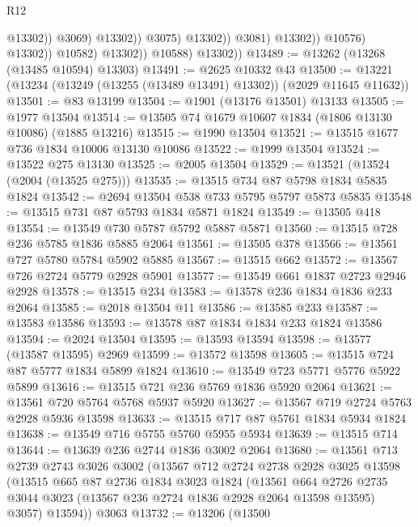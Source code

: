 \begin{lexlean}{R12}
\begin{coremodule}
                                            @13302))
                                        @3069)
                                      @13302))
                                  @3075)
                                @13302))
                            @3081)
                          @13302))
                      @10576)
                    @13302))
                @10582)
              @13302))
          @10588)
        @13302))
@13489 := @13262 (@13268 (@13485 @10594) @13303)
@13491 := @2625 @10332 @43
@13500 := @13221 (@13234 (@13249 (@13255 (@13489 @13491) @13302)) (@2029 @11645 @11632))
@13501 := @83 @13199
@13504 := @1901 (@13176 @13501) @13133
@13505 := @1977 @13504
@13514 := @13505 @74 @1679 @10607 @1834 (@1806 @13130 @10086) (@1885 @13216)
@13515 := @1990 @13504
@13521 := @13515 @1677 @736 @1834 @10006 @13130 @10086
@13522 := @1999 @13504
@13524 := @13522 @275 @13130
@13525 := @2005 @13504
@13529 := @13521 (@13524 (@2004 (@13525 @275)))
@13535 := @13515 @734 @87 @5798 @1834 @5835 @1824
@13542 := @2694 @13504 @538 @733 @5795 @5797 @5873 @5835
@13548 := @13515 @731 @87 @5793 @1834 @5871 @1824
@13549 := @13505 @418
@13554 := @13549 @730 @5787 @5792 @5887 @5871
@13560 := @13515 @728 @236 @5785 @1836 @5885 @2064
@13561 := @13505 @378
@13566 := @13561 @727 @5780 @5784 @5902 @5885
@13567 := @13515 @662
@13572 := @13567 @726 @2724 @5779 @2928 @5901
@13577 := @13549 @661 @1837 @2723 @2946 @2928
@13578 := @13515 @234
@13583 := @13578 @236 @1834 @1836 @233 @2064
@13585 := @2018 @13504 @11
@13586 := @13585 @233
@13587 := @13583 @13586
@13593 := @13578 @87 @1834 @1834 @233 @1824 @13586
@13594 := @2024 @13504
@13595 := @13593 @13594
@13598 := @13577 (@13587 @13595) @2969
@13599 := @13572 @13598
@13605 := @13515 @724 @87 @5777 @1834 @5899 @1824
@13610 := @13549 @723 @5771 @5776 @5922 @5899
@13616 := @13515 @721 @236 @5769 @1836 @5920 @2064
@13621 := @13561 @720 @5764 @5768 @5937 @5920
@13627 := @13567 @719 @2724 @5763 @2928 @5936 @13598
@13633 := @13515 @717 @87 @5761 @1834 @5934 @1824
@13638 := @13549 @716 @5755 @5760 @5955 @5934
@13639 := @13515 @714
@13644 := @13639 @236 @2744 @1836 @3002 @2064
@13680 := @13561
    @713
    @2739
    @2743
    @3026
    @3002
    (@13567
      @712
      @2724
      @2738
      @2928
      @3025
      @13598
      (@13515
        @665
        @87
        @2736
        @1834
        @3023
        @1824
        (@13561
          @664
          @2726
          @2735
          @3044
          @3023
          (@13567 @236 @2724 @1836 @2928 @2064 @13598 @13595)
          @3057)
        @13594))
    @3063
@13732 := @13206
    (@13500

\end{coremodule}
\end{lexlean}

